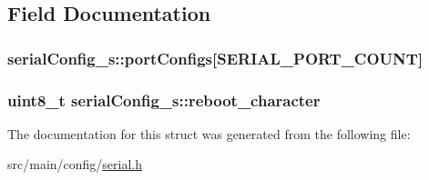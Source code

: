 \subsection{Field Documentation}
\hypertarget{structserialConfig__s_ab42c30ae7b86c9954a9301a5aecd759c}{
\subsubsection[{port\+Configs}]{ serial\+Config\+\_\+s\+::port\+Configs\mbox{[}{\bf S\+E\+R\+I\+A\+L\+\_\+\+P\+O\+R\+T\+\_\+\+C\+O\+U\+N\+T}\mbox{]}}}\label{structserialConfig__s_ab42c30ae7b86c9954a9301a5aecd759c}
\hypertarget{structserialConfig__s_ae339221260676ebdb195ce66defc32ee}{
\subsubsection[{reboot\+\_\+character}]{\setlength{\rightskip}{0pt plus 5cm}uint8\+\_\+t serial\+Config\+\_\+s\+::reboot\+\_\+character}}\label{structserialConfig__s_ae339221260676ebdb195ce66defc32ee}


The documentation for this struct was generated from the following file\+:\begin{DoxyCompactItemize}
\item 
src/main/config/\hyperlink{config_2serial_8h}{serial.\+h}\end{DoxyCompactItemize}
